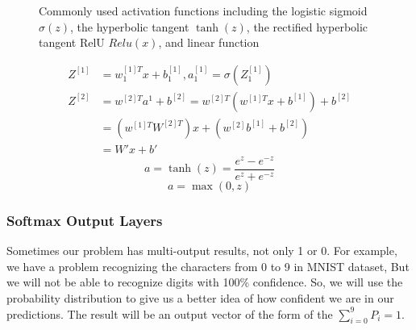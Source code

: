 \begin{figure}[!t]
 \centering
%
% 
%
 \caption{Commonly used activation functions including the logistic sigmoid $\sigma(z)$, the hyperbolic tangent $\tanh(z)$, the rectified hyperbolic tangent RelU $Relu(x)$, and linear function}
\end{figure}%
\begin{subequations}\label{eq:linear_fun_limitations}
  \begin{align}
   Z^{[1]} & = w_1^{[1]T} x + b_1^{[1]} , a_1^{[1]} = \sigma(Z_1^{[1]}) \\
   Z^{[2]} & = w^{[2]T} a^1 + b^{[2]} = w^{[2]T} (w^{[1]T}x + b^{[1]}) + b^{[2]}\\
   & = (w^{[1]T}W^{[2]T})x + (w^{[2]}b^{[1]}+ b^{[2]})\\
   & = W' x + b'
\end{align}
\end{subequations}%
\begin{equation}\label{eq:nn_tanh}
 a = \tanh(z) =\frac{e^z-e^{-z}}{e^z+e^{-z}}
\end{equation}%
\begin{equation}\label{eq:nn_relu}
 a = \max(0,z)
\end{equation}%

\subsubsection{Softmax Output Layers}

Sometimes our problem has multi-output results, not only 1 or 0. For example, we have a problem recognizing the characters from 0 to 9 in MNIST dataset, But we will not be able to recognize digits with 100\% confidence. So, we will use the probability distribution to give us a better idea of how confident we are in our predictions. The result will be an output vector of the form of the $\sum_{i = 0}^9P_i=1$.

